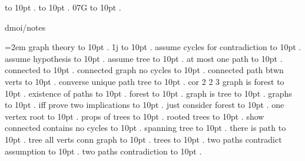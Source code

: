  \leaders\hbox to 10pt {\hss.\hss}  \hfill {}
 \leaders\hbox to 10pt {\hss.\hss}  \hfill {}
\smallskip
07G \leaders\hbox to 10pt {\hss.\hss}  \hfill {}
\smallskip
\par\endgroup
\bigskip
{}
dmoi/notes
\par\begingroup
\leftskip=2em
\smallskip
{} graph theory \leaders\hbox to 10pt {\hss.\hss}  \hfill {}
\smallskip
1j \leaders\hbox to 10pt {\hss.\hss}  \hfill {}
\smallskip
assume cycles for contradiction \leaders\hbox to 10pt {\hss.\hss}  \hfill {}
\smallskip
assume hypothesis \leaders\hbox to 10pt {\hss.\hss}  \hfill {}
\smallskip
assume tree \leaders\hbox to 10pt {\hss.\hss}  \hfill {}
\smallskip
at most one path \leaders\hbox to 10pt {\hss.\hss}  \hfill {}
\smallskip
connected \leaders\hbox to 10pt {\hss.\hss}  \hfill {}
\smallskip
connected graph no cycles \leaders\hbox to 10pt {\hss.\hss}  \hfill {}
\smallskip
connected path btwn verts \leaders\hbox to 10pt {\hss.\hss}  \hfill {}
\smallskip
converse unique path tree \leaders\hbox to 10pt {\hss.\hss}  \hfill {}
\smallskip
cor 2 2 3 graph is forest \leaders\hbox to 10pt {\hss.\hss}  \hfill {}
\smallskip
existence of paths \leaders\hbox to 10pt {\hss.\hss}  \hfill {}
\smallskip
forest \leaders\hbox to 10pt {\hss.\hss}  \hfill {}
\smallskip
graph is tree \leaders\hbox to 10pt {\hss.\hss}  \hfill {}
\smallskip
graphs \leaders\hbox to 10pt {\hss.\hss}  \hfill {}
\smallskip
iff prove two implications \leaders\hbox to 10pt {\hss.\hss}  \hfill {}
\smallskip
just consider forest \leaders\hbox to 10pt {\hss.\hss}  \hfill {}
\smallskip
one vertex root \leaders\hbox to 10pt {\hss.\hss}  \hfill {}
\smallskip
props of trees \leaders\hbox to 10pt {\hss.\hss}  \hfill {}
\smallskip
rooted trees \leaders\hbox to 10pt {\hss.\hss}  \hfill {}
\smallskip
show connected contains no cycles \leaders\hbox to 10pt {\hss.\hss}  \hfill {}
\smallskip
spanning tree \leaders\hbox to 10pt {\hss.\hss}  \hfill {}
\smallskip
there is path \leaders\hbox to 10pt {\hss.\hss}  \hfill {}
\smallskip
tree all verts conn graph \leaders\hbox to 10pt {\hss.\hss}  \hfill {}
\smallskip
trees \leaders\hbox to 10pt {\hss.\hss}  \hfill {}
\smallskip
two paths contradict assumption \leaders\hbox to 10pt {\hss.\hss}  \hfill {}
\smallskip
two paths contradiction \leaders\hbox to 10pt {\hss.\hss}  \hfill {}
